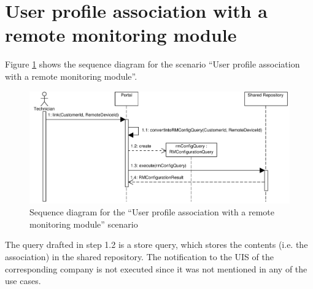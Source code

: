 \section{User profile association with a remote monitoring module}

\npar Figure \ref{fig:scenario-5-2} shows the sequence diagram for the scenario
``User profile association with a remote monitoring module''.

\begin{figure}[H]
	\begin{centering}
		\includegraphics[width=\textwidth]{figs/scenario-5-2.pdf}
		\caption{Sequence diagram for the ``User profile association with a remote
		monitoring module'' scenario}
		\label{fig:scenario-5-2}
	\end{centering}
\end{figure}

\npar The query drafted in step 1.2 is a store query, which stores the contents
(i.e. the association) in the shared repository. The notification to the UIS of
the corresponding company is not executed since it was not mentioned in any of
the use cases.
